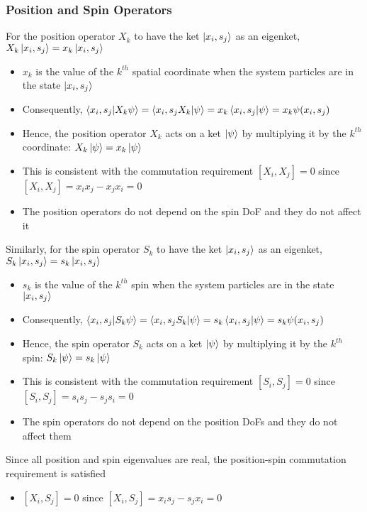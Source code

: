 \documentclass[8pt,t,mathserif,aspectratio=169]{beamer}
\begin{document}
\begin{frame}
  \frametitle{Position and Spin Operators}
  \vspace{1mm}
  For the position operator $X_k$ to have the ket $\ket{x_i,s_j}$ as an eigenket, $X_k \ket{x_i,s_j} = x_k \ket{x_i,s_j}$
  \begin{itemize}
    \item $x_k$ is the value of the $k^{th}$ spatial coordinate when the system particles are in the state $\ket{x_i,s_j}$
    \item Consequently, $\braket{x_i,s_j}{X_k \psi} = \bra{x_i,s_j X_k} \ket{\psi} = x_k \braket{x_i,s_j}{\psi} = x_k \psi(x_i,s_j)$
    \item Hence, the position operator $X_k$ acts on a ket $\ket{\psi}$ by multiplying it by the $k^{th}$ coordinate: $X_k \ket{\psi} = x_k \ket{\psi}$
    \item This is consistent with the commutation requirement $[X_i,X_j] = 0$ since $[X_i,X_j] = x_i x_j - x_j x_i = 0$
    \item The position operators do not depend on the spin DoF and they do not affect it
  \end{itemize}
  Similarly, for the spin operator $S_k$ to have the ket $\ket{x_i,s_j}$ as an eigenket, $S_k \ket{x_i,s_j} = s_k \ket{x_i,s_j}$
  \begin{itemize}
    \item $s_k$ is the value of the $k^{th}$ spin when the system particles are in the state $\ket{x_i,s_j}$
    \item Consequently, $\braket{x_i,s_j}{S_k \psi} = \bra{x_i,s_j S_k} \ket{\psi} = s_k \braket{x_i,s_j}{\psi} = s_k \psi(x_i,s_j)$
    \item Hence, the spin operator $S_k$ acts on a ket $\ket{\psi}$ by multiplying it by the $k^{th}$ spin: $S_k \ket{\psi} = s_k \ket{\psi}$
    \item This is consistent with the commutation requirement $[S_i,S_j] = 0$ since $[S_i,S_j] = s_i s_j - s_j s_i = 0$
    \item The spin operators do not depend on the position DoFs and they do not affect them
  \end{itemize}
  Since all position and spin eigenvalues are real, the position-spin commutation requirement is satisfied
  \begin{itemize}
    \item $[X_i,S_j] = 0$ since $[X_i,S_j] = x_i s_j - s_j x_i = 0$
  \end{itemize}
\end{frame}
\end{document}
